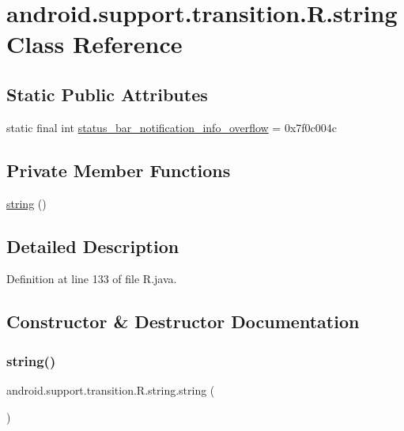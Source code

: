 \hypertarget{classandroid_1_1support_1_1transition_1_1_r_1_1string}{}\section{android.\+support.\+transition.\+R.\+string Class Reference}
\label{classandroid_1_1support_1_1transition_1_1_r_1_1string}
\subsection*{Static Public Attributes}
\begin{DoxyCompactItemize}
\item 
static final int \mbox{\hyperlink{classandroid_1_1support_1_1transition_1_1_r_1_1string_af545e59339bc447d1f12b77542fae31f}{status\+\_\+bar\+\_\+notification\+\_\+info\+\_\+overflow}} = 0x7f0c004c
\end{DoxyCompactItemize}
\subsection*{Private Member Functions}
\begin{DoxyCompactItemize}
\item 
\mbox{\hyperlink{classandroid_1_1support_1_1transition_1_1_r_1_1string_a80a6182823f1d201a4b24c9db8683b56}{string}} ()
\end{DoxyCompactItemize}


\subsection{Detailed Description}


Definition at line 133 of file R.\+java.



\subsection{Constructor \& Destructor Documentation}
\mbox{\label{classandroid_1_1support_1_1transition_1_1_r_1_1string_a80a6182823f1d201a4b24c9db8683b56}} 
\subsubsection{\texorpdfstring{string()}{string()}}
{\footnotesize\ttfamily android.\+support.\+transition.\+R.\+string.\+string (\begin{DoxyParamCaption}{ }\end{DoxyParamCaption})\hspace{0.3cm}{\ttfamily [private]}}



